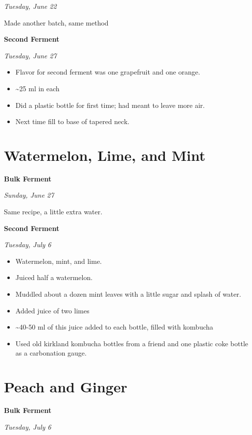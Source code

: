 \documentclass[
]{book}
\providecommand{\tightlist}{%
  \setlength{\itemsep}{0pt}\setlength{\parskip}{0pt}}
\begin{document}
\emph{Tuesday, June 22}

Made another batch, same method

\textbf{Second Ferment}

\emph{Tuesday, June 27}

\begin{itemize}
\tightlist
\item
  Flavor for second ferment was one grapefruit and one orange.
\item
  \textasciitilde25 ml in each
\item
  Did a plastic bottle for first time; had meant to leave more air.
\item
  Next time fill to base of tapered neck.
\end{itemize}

\hypertarget{watermelon-lime-and-mint}{%
\section{Watermelon, Lime, and Mint}\label{watermelon-lime-and-mint}}

\textbf{Bulk Ferment}

\emph{Sunday, June 27}

Same recipe, a little extra water.

\textbf{Second Ferment}

\emph{Tuesday, July 6}

\begin{itemize}
\tightlist
\item
  Watermelon, mint, and lime.
\item
  Juiced half a watermelon.
\item
  Muddled about a dozen mint leaves with a little sugar and splash of water.
\item
  Added juice of two limes
\item
  \textasciitilde40-50 ml of this juice added to each bottle, filled with kombucha
\item
  Used old kirkland kombucha bottles from a friend and one plastic coke bottle as a carbonation gauge.
\end{itemize}

\hypertarget{peach-and-ginger}{%
\section{Peach and Ginger}\label{peach-and-ginger}}

\textbf{Bulk Ferment}

\emph{Tuesday, July 6}
\end{document}
